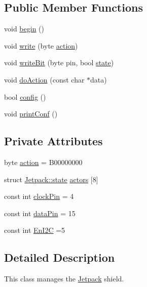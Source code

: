 \subsection*{Public Member Functions}
\begin{DoxyCompactItemize}
\item 
void \hyperlink{class_jetpack_a5a53e1ebf7aaf3bf3e0d37ea64ca09a7}{begin} ()
\item 
void \hyperlink{class_jetpack_a338f1af8cbc6504ac69b47c7328569b5}{write} (byte \hyperlink{class_jetpack_aca3142925a7b0834b34ae91d26af7765}{action})
\item 
void \hyperlink{class_jetpack_a79ae7bc3c1828a0551a7c005c4f8bd00}{write\+Bit} (byte pin, bool \hyperlink{struct_jetpack_1_1state}{state})
\item 
void \hyperlink{class_jetpack_a9e703197093094b963f9ad57817495b8}{do\+Action} (const char $\ast$data)
\item 
bool \hyperlink{class_jetpack_ab065ee83e244265a2223a22f3ee4a719}{config} ()
\item 
void \hyperlink{class_jetpack_ac54a7bb4f9166bee32052253d9b1d306}{print\+Conf} ()
\end{DoxyCompactItemize}
\subsection*{Private Attributes}
\begin{DoxyCompactItemize}
\item 
byte \hyperlink{class_jetpack_aca3142925a7b0834b34ae91d26af7765}{action} = B00000000
\item 
struct \hyperlink{struct_jetpack_1_1state}{Jetpack\+::state} \hyperlink{class_jetpack_a7e16d2f97837f9712a2e6de1c50d99db}{actors} \mbox{[}8\mbox{]}
\item 
const int \hyperlink{class_jetpack_a58ebb991f358f3ae94e82148b0221b5a}{clock\+Pin} = 4
\item 
const int \hyperlink{class_jetpack_a3d669a56e93c71dd25f970d4ed7d0c00}{data\+Pin} = 15
\item 
const int \hyperlink{class_jetpack_a81df984fb4cea98c71aa1a1cfcdfe814}{En\+I2C} =5
\end{DoxyCompactItemize}


\subsection{Detailed Description}
This class manages the \hyperlink{class_jetpack}{Jetpack} shield. 

